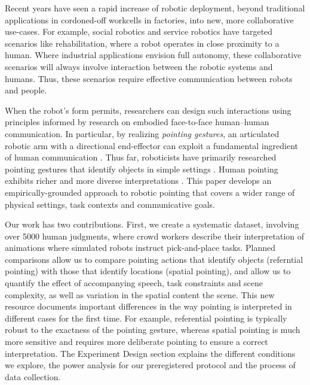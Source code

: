 Recent years have seen a rapid increase of robotic deployment, beyond traditional applications in cordoned-off workcells in factories, into new, more collaborative use-cases. For example, social robotics and service robotics have targeted scenarios like rehabilitation, where a robot operates in close proximity to a human. Where industrial applications envision full autonomy, these collaborative scenarios will always involve interaction between the robotic systems and humans. Thus, these scenarios require effective communication between robots and people.

When the robot's form permits, researchers can design such interactions using principles informed by research on embodied face-to-face human--human communication.  In particular, by realizing \emph{pointing gestures}, an articulated robotic arm with a directional end-effector can exploit a fundamental ingredient of human communication \cite{kita2003pointing}.  Thus far, roboticists have primarily researched pointing gestures that identify objects in simple settings \cite[a.o.]{han2018placing,holladay2014legible,zhao2016experimental}.  Human pointing exhibits richer and more diverse interpretations \cite{kendon:2004}.  This paper develops an empirically-grounded approach to robotic pointing that covers a wider range of physical settings, task contexts and communicative goals.

Our work has two contributions.  First, we create a systematic dataset, involving over 5000 human judgments, where crowd workers describe their interpretation of animations where simulated robots instruct pick-and-place tasks.  Planned comparisons allow us to compare pointing actions that identify objects (referntial pointing) with those that identify locations (spatial pointing), and allow us to quantify the effect of accompanying speech, task constraints and scene complexity, as well as variation in the spatial content the scene.  This new resource documents important differences in the way pointing is interpreted in different cases for the first time.  For example, referential pointing is typically robust to the exactness of the pointing gesture, whereas spatial pointing is much more sensitive and requires more deliberate pointing to ensure a correct interpretation.  The Experiment Design section explains the different conditions we explore, the power analysis for our preregistered protocol and the process of data collection. 

